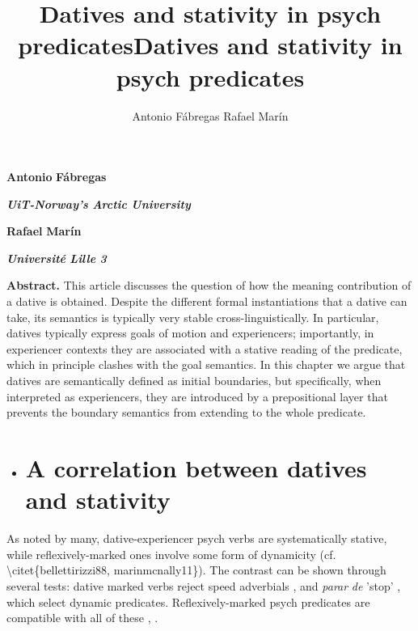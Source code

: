 \documentclass[output=paper,modfonts,nonflat]{langsci/langscibook}
\author{Antonio Fábregas\affiliation{}\lastand 
Rafael Marín\affiliation{}}
\title{Datives and stativity in psych predicates}
\begin{document}
\maketitle 

\title{Datives and stativity in psych predicates}

\textbf{Antonio} \textbf{Fábregas}

\textbf{\textit{UiT-Norway's} \textit{Arctic} \textit{University}}

\textbf{Rafael} \textbf{Marín}

\textbf{\textit{Université} \textit{Lille} \textit{3}}

\begin{stylelsAbstract}
\textbf{Abstract.} This article discusses the question of how the meaning contribution of a dative is obtained. Despite the different formal instantiations that a dative can take, its semantics is typically very stable cross-linguistically. In particular, datives typically express goals of motion and experiencers; importantly, in experiencer contexts they are associated with a stative reading of the predicate, which in principle clashes with the goal semantics. In this chapter we argue that datives are semantically defined as initial boundaries, but specifically, when interpreted as experiencers, they are introduced by a prepositional layer that prevents the boundary semantics from extending to the whole predicate.
\end{stylelsAbstract}

\begin{itemize}
\item \section{A correlation between datives and stativity}
\end{itemize}

As noted by many, dative-experiencer psych verbs are systematically stative, while reflexively-marked ones involve some form of dynamicity (cf. {\textbackslash}citet\{bellettirizzi88, marinmcnally11\}). The contrast can be shown through several tests: dative marked verbs reject speed adverbials , and \textit{parar} \textit{de} 'stop' , which select dynamic predicates. Reflexively-marked psych predicates are compatible with all of these , .

\ea%
    \label{ex:key:1}
    \gll\\
        \\
    \glt
    \z
\end{document}
